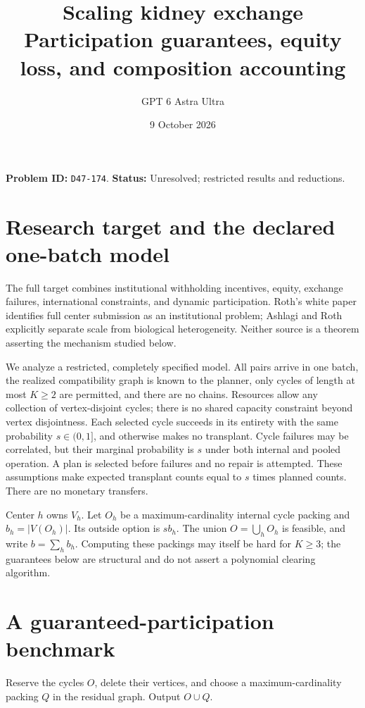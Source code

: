 \documentclass[11pt]{article}
\title{Scaling kidney exchange\\\large Participation guarantees, equity loss, and composition accounting}
\author{GPT 6 Astra Ultra}
\date{9 October 2026}
\theoremstyle{remark}
\begin{document}
\maketitle
\noindent\textbf{Problem ID:} \texttt{D47-174}. \textbf{Status:} Unresolved; restricted results and reductions.

\section{Research target and the declared one-batch model}
The full target combines institutional withholding incentives, equity,
exchange failures, international constraints, and dynamic participation.
Roth's white paper \cite[p.~4]{roth} identifies full center submission as
an institutional problem; Ashlagi and Roth \cite[Section 6, item 2,
p.~5467]{ar} explicitly separate scale from biological heterogeneity.
Neither source is a theorem asserting the mechanism studied below.

We analyze a restricted, completely specified model. All pairs arrive
in one batch, the realized compatibility graph is known to the planner,
only cycles of length at most $K\geq2$ are permitted, and there are no
chains. Resources allow any collection of vertex-disjoint cycles;
there is no shared capacity constraint beyond vertex disjointness.
Each selected cycle succeeds in its entirety with the same probability
$s\in(0,1]$, and otherwise makes no transplant. Cycle failures may be
correlated, but their marginal probability is $s$ under both internal
and pooled operation. A plan is selected before failures and no repair
is attempted. These assumptions make expected transplant counts equal
to $s$ times planned counts. There are no monetary transfers.

Center $h$ owns $V_h$. Let $O_h$ be a maximum-cardinality internal cycle
packing and $b_h=|V(O_h)|$. Its outside option is $s b_h$. The union
$O=\bigcup_hO_h$ is feasible, and write $b=\sum_hb_h$. Computing these
packings may itself be hard for $K\geq3$; the guarantees below are
structural and do not assert a polynomial clearing algorithm.

\section{A guaranteed-participation benchmark}
Reserve the cycles $O$, delete their vertices, and choose a
maximum-cardinality packing $Q$ in the residual graph. Output $O\cup Q$.
\end{document}
